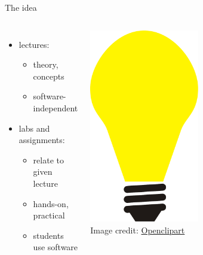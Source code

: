 \documentclass[xcolor={dvipsnames,usenames},beamer,aspectratio=169]{beamer}
\begin{document}
\begin{frame}{The idea}

\begin{columns}[c]


\begin{itemize}
 \item lectures:
 \begin{itemize}
  \item theory, concepts
  \item software-independent
 \end{itemize}
 \item labs and assignments:
 \begin{itemize}
  \item relate to given lecture
  \item hands-on, practical
  \item students use software
 \end{itemize}
\end{itemize}


\bigskip

\centering
\includegraphics[width=0.5\textwidth]{./images/general/bulp}%
\\
\tiny
\color{gray}
Image credit: \href{https://openclipart.org}{Openclipart}

\end{columns}

\end{frame}
\end{document}
